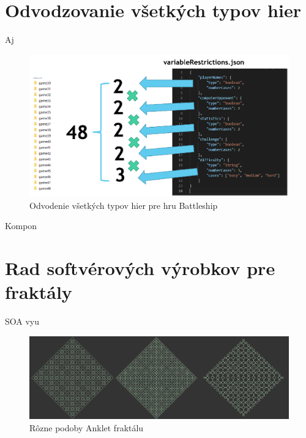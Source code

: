 \documentclass[11pt,slovak,a4paper,twoside]{article}
\begin{document}
\section{Odvodzovanie všetkých typov hier} \label{engineAsSubsystem}

Aj 

\begin{figure}[H]  %
					\begin{center}
									\includegraphics[width=\linewidth]{fig/allCases.png}
									\caption{Odvodenie všetkých typov hier pre hru Battleship}
									\label{derivationBattleshipTypes}
					\end{center}
\end{figure}

Kompon    



\section{Rad softvérových výrobkov pre fraktály} \label{distributedSOA}

SOA vyu\ 

\begin{figure}[H]  %
					\begin{center}
									\includegraphics[width=\linewidth]{fig/fractalsAnklet.png}
									\caption{Rôzne podoby Anklet fraktálu}
									\label{ankletFractalTypes}
					\end{center}
\end{figure}
\end{document}
